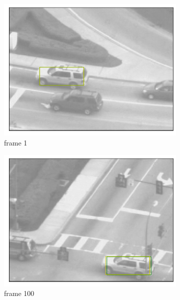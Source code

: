 \documentclass[11pt]{article}
\begin{document}
\begin{figure}[h!]
    \begin{subfigure}{.195\textwidth}
      \centering
      \includegraphics[width=.95\linewidth]{../results/carseqrects-wrct_0.png}
      \caption{frame 1}
    \end{subfigure}
    \begin{subfigure}{.195\textwidth}
      \centering
      \includegraphics[width=.95\linewidth]{../results/carseqrects-wrct_99.png}
      \caption{frame 100}
    \end{subfigure}
    \begin{subfigure}{.195\textwidth}
      \centering

\end{subfigure}
\end{figure}
\end{document}
